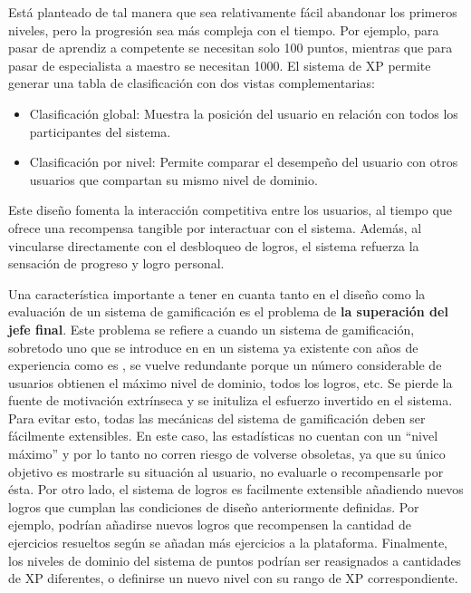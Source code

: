 Está planteado de tal manera que sea relativamente fácil abandonar los primeros niveles, pero la progresión sea más compleja con el tiempo. Por ejemplo, para pasar de aprendiz a competente se necesitan solo 100 puntos, mientras que para pasar de especialista a maestro se necesitan 1000. 
El sistema de XP permite generar una tabla de clasificación con dos vistas complementarias:

\begin{itemize}
    \item Clasificación global: Muestra la posición del usuario en relación con todos los participantes del sistema.
    \item Clasificación por nivel: Permite comparar el desempeño del usuario con otros usuarios que compartan su mismo nivel de dominio.
\end{itemize}

Este diseño fomenta la interacción competitiva entre los usuarios, al tiempo que ofrece una recompensa\textbf{ }tangible por interactuar con el sistema. Además, al vincularse directamente con el desbloqueo de logros, el sistema refuerza la sensación de progreso y logro personal.

Una característica importante a tener en cuanta tanto en el diseño como la evaluación de un sistema de gamificación es el problema de \textbf{la superación del jefe final}. Este problema se refiere a cuando un sistema de gamificación, sobretodo uno que se introduce en en un sistema ya existente con años de experiencia como es \aer, se vuelve redundante porque un número considerable de usuarios obtienen el máximo nivel de dominio, todos los logros, etc. Se pierde la fuente de motivación extrínseca y se inituliza el esfuerzo invertido en el sistema. Para evitar esto, todas las mecánicas del sistema de gamificación deben ser fácilmente extensibles. 
En este caso, las estadísticas no cuentan con un \enquote{nivel máximo} y por lo tanto no corren riesgo de volverse obsoletas, ya que su único objetivo es mostrarle su situación al usuario, no evaluarle o recompensarle por ésta. Por otro lado, el sistema de logros es facilmente extensible añadiendo nuevos logros que cumplan las condiciones de diseño anteriormente definidas. Por ejemplo, podrían añadirse nuevos logros que recompensen la cantidad de ejercicios resueltos según se añadan más ejercicios a la plataforma. Finalmente, los niveles de dominio del sistema de puntos podrían ser reasignados a cantidades de XP diferentes, o definirse un nuevo nivel con su rango de XP correspondiente.

